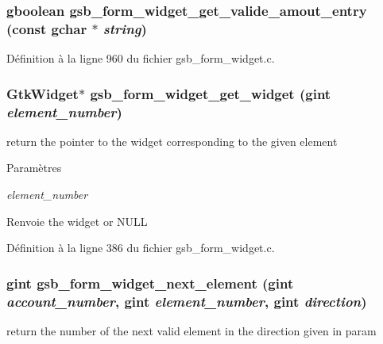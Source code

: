 \subsubsection[{gsb\_\-form\_\-widget\_\-get\_\-valide\_\-amout\_\-entry}]{\setlength{\rightskip}{0pt plus 5cm}gboolean gsb\_\-form\_\-widget\_\-get\_\-valide\_\-amout\_\-entry (const gchar $\ast$ {\em string})}\label{gsb__form__widget_8h_a8278574a493b1c7f20ba557c3cb82344}


Définition à la ligne 960 du fichier gsb\_\-form\_\-widget.c.

\subsubsection[{gsb\_\-form\_\-widget\_\-get\_\-widget}]{\setlength{\rightskip}{0pt plus 5cm}GtkWidget$\ast$ gsb\_\-form\_\-widget\_\-get\_\-widget (gint {\em element\_\-number})}\label{gsb__form__widget_8h_ad3d6e5f87dcce9c175f2f402fc63d94e}
return the pointer to the widget corresponding to the given element


\begin{DoxyParams}{Paramètres}
\item[{\em element\_\-number}]\end{DoxyParams}
\begin{DoxyReturn}{Renvoie}
the widget or NULL 
\end{DoxyReturn}


Définition à la ligne 386 du fichier gsb\_\-form\_\-widget.c.

\subsubsection[{gsb\_\-form\_\-widget\_\-next\_\-element}]{\setlength{\rightskip}{0pt plus 5cm}gint gsb\_\-form\_\-widget\_\-next\_\-element (gint {\em account\_\-number}, \/  gint {\em element\_\-number}, \/  gint {\em direction})}\label{gsb__form__widget_8h_ad677f89db19be4b34cfe527f41387617}
return the number of the next valid element in the direction given in param


